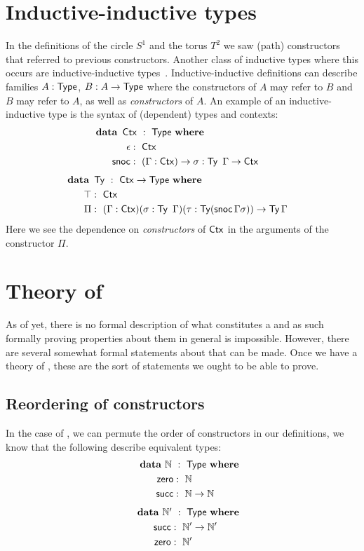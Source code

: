 \documentclass[a4paper,10pt]{report}
\begin{document}
\section{Inductive-inductive types}
\label{sec:inductiveinductive}

In the definitions of the circle $S^1$ and the torus $T^2$ we saw
(path) constructors that referred to previous constructors. Another
class of inductive types where this occurs are inductive-inductive
types~\cite{Altenkirch2011}. Inductive-inductive definitions can
describe families $A : \mathsf{Type}$, $B : A \to \mathsf{Type}$ where the
constructors of $A$ may refer to $B$ and $B$ may refer to $A$, as well
as \emph{constructors} of $A$. An example of an inductive-inductive
type is the syntax of (dependent) types and contexts:
%
\begin{alignat*}{2}
  &\rlap{$\data\ \Ctx\ :\ \Type\ \where$} \\
  &&\ \ \epsilon &:\ \Ctx \\
  &&\ \ \snoc    &:\ (\Gamma : \Ctx) \to \sigma : \Ty\ \Gamma \to \Ctx
\end{alignat*}
%
\begin{alignat*}{2}
  &\rlap{$\data\ \Ty\ :\ \Ctx \to \Type\ \where$} \\
  &&\ \ \unitty &:\ \Ctx \\
  &&\ \ \Pi     &:\ (\Gamma : \Ctx) (\sigma : \Ty\ \Gamma) (\tau : \Ty (\snoc \Gamma \sigma)) \to \Ty \Gamma
\end{alignat*}
%
Here we see the dependence on \emph{constructors} of $\operatorname{\mathsf{Ctx}}$ in the
arguments of the constructor $\Pi$.

\section{Theory of \hits}
\label{sec:theoryhits}

As of yet, there is no formal description of what constitutes a \hit
and as such formally proving properties about them in general is
impossible. However, there are several somewhat formal statements
about \hits that can be made. Once we have a theory of \hits, these
are the sort of statements we ought to be able to prove.

\subsection{Reordering of constructors}

In the case of \oits, we can permute the order of constructors in our
definitions, \ie we know that the following describe equivalent types:
%
\begin{alignat*}{2}
  &\rlap{$\data\ \Nat\ :\ \Type\ \where$} \\
  &&\ \ \zero &:\ \Nat \\
  &&\ \ \suc  &:\ \Nat \to \Nat
\end{alignat*}
%
\begin{alignat*}{2}
  &\rlap{$\data\ \Nat^\prime\ :\ \Type\ \where$} \\
  &&\ \ \suc  &:\ \Nat^\prime \to \Nat^\prime \\
  &&\ \ \zero &:\ \Nat^\prime
\end{alignat*}
\end{document}
